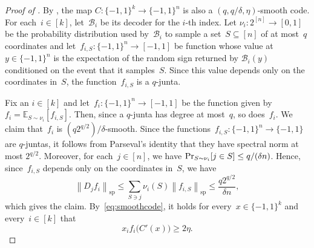 \documentclass{toc}
\newcommand{\pmset}[1]{\{-1,1\}^{#1}} %
\newcommand{\E}{\mathbb{E}}
\newcommand{\specnorm}[1]{\left\lVert #1 \right\rVert_{\mathrm{sp}}}
\renewcommand{\Pr}{\mbox{\rm Pr}}
\newcommand{\beq}{\begin{equation}}
\newcommand{\eeq}{\end{equation}}
\newcommand{\beqn}{\begin{equation*}}
\newcommand{\eeqn}{\end{equation*}}
\begin{document}
\begin{proof}[Proof of ]
By , the map $C:\pmset{k}\to\pmset{n}$ is also a $(q,q/\delta,\eta)$-smooth code. For each~$i\in[k]$, let~$\mathcal B_i$ be its decoder for the $i$-th %
index.
Let $\nu_i:2^{[n]}\to [0,1]$ be the probability distribution used by~$\mathcal B_i$ to sample a set~$S\subseteq[n]$ of at most~$q$ coordinates and 
 let~$f_{i,S}:\pmset{n}\to [-1,1]$ be function whose value at $y\in\pmset{n}$ is the expectation of the random sign returned by $\mathcal B_i(y)$ conditioned on the event that it samples~$S$. Since this value depends only on the coordinates in~$S$, the function~$f_{i,S}$ is a $q$-junta.

Fix an $i\in[k]$ and let~$f_i:\pmset{n}\to [-1,1]	$ be the function given by $f_i =\E_{S\sim\nu_i}[f_{i,S}]$.
Then, since a $q$-junta has degree at most~$q$, so does~$f_i$.
We claim that~$f_i$ is $(q2^{q/2})/\delta$-smooth.
Since the functions~$f_{i,S}:\pmset{n}\to\pmset{}$ are $q$-juntas, it follows from Parseval's identity that they have spectral norm at most $2^{q/2}$. 
Moreover, for each~$j\in[n]$, we have $\Pr_{S\sim\nu_i}[j\in S] \leq q/(\delta n)$.
Hence, since~$f_{i,S}$ depends only on the coordinates in~$S$, we have
\beqn
\specnorm{D_jf_i}
\leq
\sum_{S\ni j}\nu_i(S)\specnorm{f_{i,S}}
\leq
\frac{q2^{q/2}}{\delta n},
\eeqn
which gives the claim.
By~\eqref{eq:smoothcode}, it holds for every~$x\in\pmset{k}$ and every~$i\in[k]$ that
\beq\label{eq:smoothcode2}
x_if_i\big(C'(x)\big)\geq 2\eta.
\eeq


\end{proof}
\end{document}
